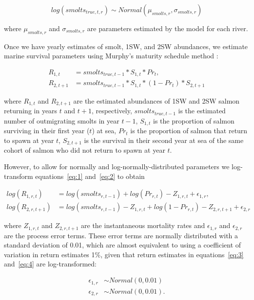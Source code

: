 \documentclass[12pt]{article}
\begin{document}
\begin{equation}
log(smolts_{true,t,r}) \sim Normal(\mu_{smolts,r}, \sigma_{smolts,r})
\end{equation}

where $\mu_{smolts,r}$ and $\sigma_{smolts,r}$ are parameters estimated by the
model for each river.

Once we have yearly estimates of smolt, 1SW, and 2SW abundances, we estimate
marine survival parameters using Murphy's maturity schedule method
\citep{Murphy1952, Ricker1975}:

\begin{align}
    R_{1,t} &= smolts_{true,t-1} * S_{1,t} * Pr_t \label{eq:1}, \\
    R_{2,t+1} &= smolts_{true,t-1} * S_{1,t} * (1 - Pr_t) * S_{2,t+1} \label{eq:2}
\end{align}

where $R_{1,t}$ and $R_{2,t+1}$ are the estimated abundances of 1SW and 2SW
salmon returning in years $t$ and $t+1$, respectively, $smolts_{true,t-1}$ is the
estimated number of outmigrating smolts in year $t-1$, $S_{1,t}$ is the proportion of
salmon surviving in their first year ($t$) at sea, $Pr_t$ is the proportion of
salmon that return to spawn at year $t$, $S_{2,t+1}$ is the survival in their
second year at sea of the same cohort of salmon who did not return to spawn at
year $t$.

However, to allow for normally and log-normally-distributed parameters we
log-transform equations~\ref{eq:1} and~\ref{eq:2} to obtain

\begin{align}
    log(R_{1,r,t}) &= log(smolts_{r,t-1}) + log(Pr_{r,t}) - Z_{1,r,t} + \epsilon_{1,r} \label{eq:3}, \\
    log(R_{2,r,t+1}) &= log(smolts_{r,t-1}) - Z_{1,r,t} + log(1 - Pr_{r,t})  - Z_{2,r,t+1} + \epsilon_{2,r} \label{eq:4} 
\end{align}

where $Z_{1,r,t}$ and $Z_{2,r,t+1}$ are the instantaneous mortality rates and $\epsilon_{1,r}$ and $\epsilon_{2,r}$
are the process error terms. 
These error terms are normally distributed with a standard deviation
of 0.01, which are almost equivalent to using a coefficient of variation in
return estimates 1\%, given that return estimates in equations~\ref{eq:3}
and~\ref{eq:4} are log-transformed:

\begin{align}
\epsilon_{1,r} &\sim Normal(0, 0.01) \\
\epsilon_{2,r} &\sim Normal(0, 0.01).
\end{align}
\end{document}
